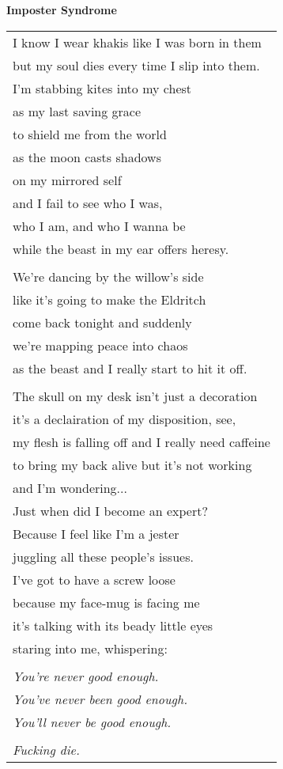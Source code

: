 \documentclass{article}
\begin{document}
\begin{center}
\textbf{Imposter Syndrome} \\
\vspace*{2ex}
\begin{tabular}{l}
I know I wear khakis like I was born in them \\
but my soul dies every time I slip into them. \\
I'm stabbing kites into my chest \\
as my last saving grace \\
to shield me from the world \\
as the moon casts shadows \\
on my mirrored self \\
and I fail to see who I was, \\
who I am, and who I wanna be \\
while the beast in my ear offers heresy. \\
\\
We're dancing by the willow's side \\
like it's going to make the Eldritch \\
come back tonight and suddenly \\
we're mapping peace into chaos \\ %
as the beast and I really start to hit it off. \\
\\
The skull on my desk isn't just a decoration \\
it's a declairation of my disposition, see, \\
my flesh is falling off and I really need caffeine \\
to bring my back alive but it's not working \\ %
and I'm wondering... \\ %

Just when did I become an expert? \\
Because I feel like I'm a jester \\ %
juggling all these people's issues. \\
I've got to have a screw loose \\
because my face-mug is facing me \\
it's talking with its beady little eyes \\
staring into me, whispering: \\ %
\\
\textit{You're never good enough.} \\
\textit{You've never been good enough.} \\
\textit{You'll never be good enough.} \\
\\
\textit{Fucking die.} \\
\end{tabular}
\end{center}
\end{document}
